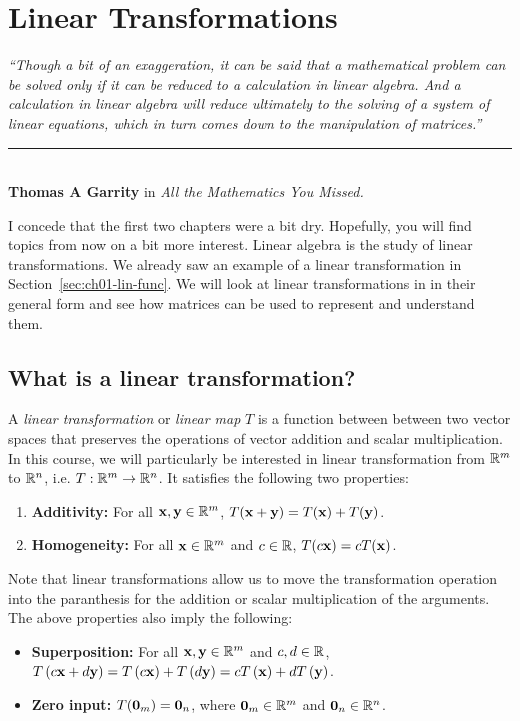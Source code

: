 \chapter{Linear Transformations}\label{chp:lintrans}


\begin{flushright}
\textit{``Though a bit of an exaggeration, it can be said that a mathematical problem can be solved only if it can be reduced to a calculation in linear algebra. And a calculation in linear algebra will reduce ultimately to the solving of a system of linear equations, which in turn comes down to the manipulation of matrices.''}\\
\rule{0.5\textwidth}{.4pt}\\
\textbf{Thomas A Garrity} \small{in \textit{All the Mathematics You Missed.}}
\end{flushright}

I concede that the first two chapters were a bit dry. Hopefully, you will find topics from now on a bit more interest. Linear algebra is the study of linear transformations. We already saw an example of a linear transformation in Section~\ref{sec:ch01-lin-func}. We will look at linear transformations in in their general form and see how matrices can be used to represent and understand them.

\section{What is a linear transformation?}\label{sec:ch03-lin-trans-def}
A \textit{linear transformation} or \textit{linear map} $T$ is a function between between two vector spaces that preserves the operations of vector addition and scalar multiplication. In this course, we will particularly be interested in linear transformation from $\mathbb{R}^m$ to $\mathbb{R}^n$, i.e. $T: \mathbb{R}^m \to \mathbb{R}^n$. It satisfies the following two properties:
\begin{enumerate}
    \item \textbf{Additivity:} For all $\mathbf{x}, \mathbf{y} \in \mathbb{R}^m$, $T(\mathbf{x} + \mathbf{y}) = T(\mathbf{x}) + T(\mathbf{y})$.
    \item \textbf{Homogeneity:} For all $\mathbf{x} \in \mathbb{R}^m$ and $c \in \mathbb{R}$, $T(c\mathbf{x}) = cT(\mathbf{x})$.
\end{enumerate}
Note that linear transformations allow us to move the transformation operation into the paranthesis for the addition or scalar multiplication of the arguments. The above properties also imply the following:
\begin{itemize}
    \item \textbf{Superposition:} For all $\mathbf{x}, \mathbf{y} \in \mathbb{R}^m$ and $c, d \in \mathbb{R}$, $T\left( c\mathbf{x} + d\mathbf{y}\right) = T\left( c\mathbf{x}\right) + T\left( d\mathbf{y}\right) = cT\left( \mathbf{x}\right) + dT\left( \mathbf{y}\right)$.
    \item \textbf{Zero input:} $T(\mathbf{0}_m) = \mathbf{0}_n$, where $\mathbf{0}_m \in \mathbb{R}^m$ and $\mathbf{0}_n \in \mathbb{R}^n$. 
\end{itemize}

